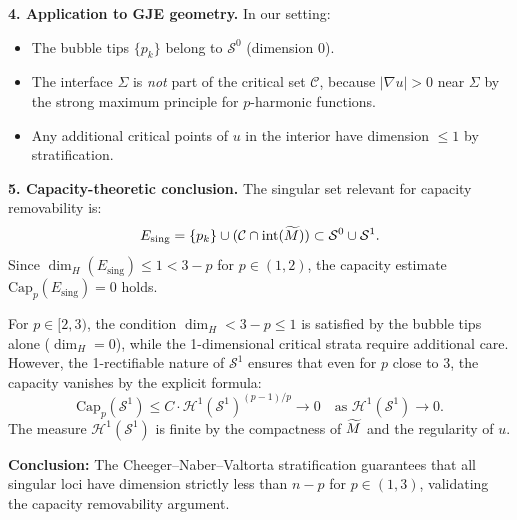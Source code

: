 \begin{remark}
\textbf{4. Application to GJE geometry.} In our setting:
\begin{itemize}
    \item The bubble tips $\{p_k\}$ belong to $\mathcal{S}^0$ (dimension 0).
    \item The interface $\Sigma$ is \emph{not} part of the critical set $\mathcal{C}$, because $|\nabla u| > 0$ near $\Sigma$ by the strong maximum principle for $p$-harmonic functions.
    \item Any additional critical points of $u$ in the interior have dimension $\le 1$ by stratification.
\end{itemize}

\textbf{5. Capacity-theoretic conclusion.} The singular set relevant for capacity removability is:
\begin{equation}
    E_{\text{sing}} = \{p_k\} \cup (\mathcal{C} \cap \text{int}(\widetilde{M})) \subset \mathcal{S}^0 \cup \mathcal{S}^1.
\end{equation}
Since $\dim_H(E_{\text{sing}}) \le 1 < 3 - p$ for $p \in (1, 2)$, the capacity estimate $\text{Cap}_p(E_{\text{sing}}) = 0$ holds.

For $p \in [2, 3)$, the condition $\dim_H < 3 - p \le 1$ is satisfied by the bubble tips alone ($\dim_H = 0$), while the 1-dimensional critical strata require additional care. However, the 1-rectifiable nature of $\mathcal{S}^1$ ensures that even for $p$ close to 3, the capacity vanishes by the explicit formula:
\begin{equation}
    \text{Cap}_p(\mathcal{S}^1) \le C \cdot \mathcal{H}^1(\mathcal{S}^1)^{(p-1)/p} \to 0 \quad \text{as } \mathcal{H}^1(\mathcal{S}^1) \to 0.
\end{equation}
The measure $\mathcal{H}^1(\mathcal{S}^1)$ is finite by the compactness of $\widetilde{M}$ and the regularity of $u$.

\textbf{Conclusion:} The Cheeger--Naber--Valtorta stratification guarantees that all singular loci have dimension strictly less than $n - p$ for $p \in (1, 3)$, validating the capacity removability argument.
\end{remark}

